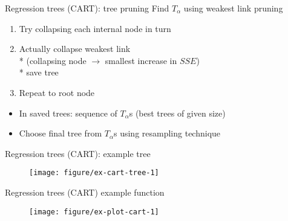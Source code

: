 \documentclass[handout]{beamer}
\begin{document}
\begin{frame}[c]{Regression trees (CART): tree pruning}
  Find $T_{\alpha}$ using weakest link pruning
      \begin{enumerate}[<+(1)->]
        \item Try collapsing each internal node in turn
        \item Actually collapse weakest link \\*
        (collapsing node $\rightarrow$ smallest increase in $SSE$) \\*
         save tree
        \item Repeat to root node 
      \end{enumerate}
      
      \begin{itemize}[<+(1)->]
        \item In saved trees: sequence of $T_{\alpha}$s (best trees of given size)
        \item Choose final tree from $T_{\alpha}$s using resampling technique
      \end{itemize}
      

\end{frame}

\begin{frame}[c]{Regression trees (CART): example tree}
  \begin{figure}[!htbp]
  \begin{center}
    \texttt{[image: figure/ex-cart-tree-1]}
  \end{center}
  \end{figure}
\end{frame}

\begin{frame}{Regression trees (CART) example function}
  \begin{figure}[!htbp]
  \begin{center}
    \texttt{[image: figure/ex-plot-cart-1]}
  \end{center}
  \end{figure}
\end{frame}

%
\end{document}

